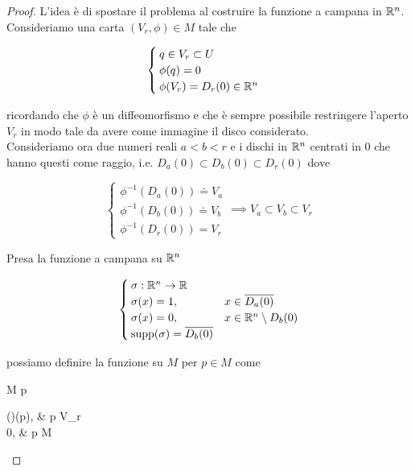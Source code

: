 \begin{proof}
	L'idea è di spostare il problema al costruire la funzione a campana in $ \mathbb{R}^{n} $.\\
	Consideriamo una carta $ (V_{r},\phi) \in M $ tale che
	
	\begin{equation}
		\begin{cases}
			q \in V_{r} \subset U\\
			\phi(q) = 0\\
			\phi(V_{r}) = D_{r}(0) \in \mathbb{R}^{n}
		\end{cases}
	\end{equation}

	ricordando che $ \phi $ è un diffeomorfismo e che è sempre possibile restringere l'aperto $ V_{r} $ in modo tale da avere come immagine il disco considerato.\\
	Consideriamo ora due numeri reali $ a < b < r $ e i dischi in $ \mathbb{R}^{n} $ centrati in 0 che hanno questi come raggio, i.e. $ D_{a}(0) \subset D_{b}(0) \subset D_{r}(0) $ dove
	
	\begin{equation}
		\begin{cases}
			\phi^{-1}(D_{a}(0)) \doteq V_{a} \\
			\phi^{-1}(D_{b}(0)) \doteq V_{b} \\
			\phi^{-1}(D_{r}(0)) = V_{r}
		\end{cases} %
		\implies %
		V_{a} \subset V_{b} \subset V_{r}
	\end{equation}
	
	
	Presa la funzione a campana su $ \mathbb{R}^{n} $
	
	\begin{equation}
		\begin{cases}
			\sigma : \mathbb{R}^{n} \to \mathbb{R} \\
			\sigma(x) = 1, & x \in \overline{D_{a}(0)} \\
			\sigma(x) = 0, & x \in \mathbb{R}^{n} \setminus D_{b}(0) \\
			\operatorname{supp}(\sigma) = \overline{D_{b}(0)}
		\end{cases}
	\end{equation}

	possiamo definire la funzione su $ M $ per $ p \in M $ come
	
	\map{\rho}
		{M}{\R}
		{p}{%
			\begin{cases}
				(\sigma \circ \phi)(p), & p \in V_{r} \\
				0, & p \in M \setminus {}
			\end{cases}
			}


\end{proof}
